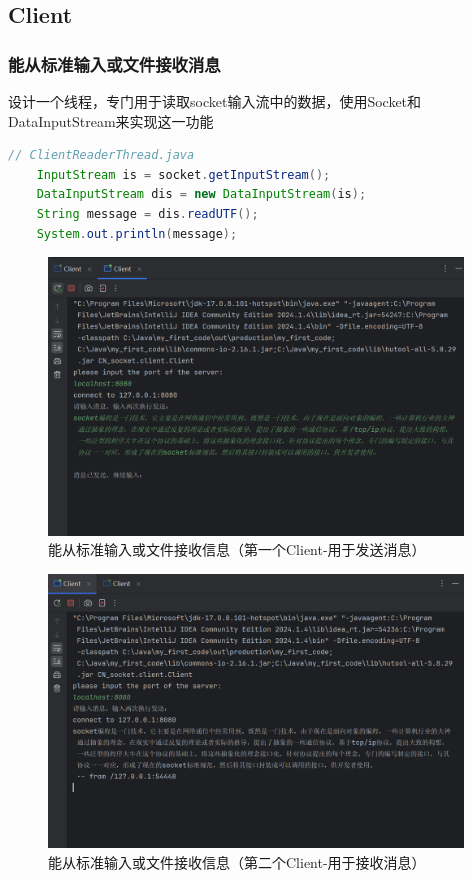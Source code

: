 \documentclass{article}
\begin{document}
	\subsection{Client}
	
	\subsubsection{能从标准输入或文件接收消息}
	
	设计一个线程，专门用于读取socket输入流中的数据，使用Socket和DataInputStream来实现这一功能
	
	\begin{lstlisting}[language=Java, title=能从标准输入或文件接收消息, tabsize=4]
	// ClientReaderThread.java
	InputStream is = socket.getInputStream();
	DataInputStream dis = new DataInputStream(is);
	String message = dis.readUTF();
	System.out.println(message);
	\end{lstlisting}
	
	\begin{figure}[H]
		\centering
		\includegraphics[width=11cm]{./images/4.能从标准输入或文件接收信息-Client1.png}
		\caption{能从标准输入或文件接收信息（第一个Client-用于发送消息）}
	\end{figure}
	
	\begin{figure}[H]
		\centering
		\includegraphics[width=11cm]{./images/4.能从标准输入或文件接收信息-Client2.png}
		\caption{能从标准输入或文件接收信息（第二个Client-用于接收消息）}
	\end{figure}
	
\end{document}

